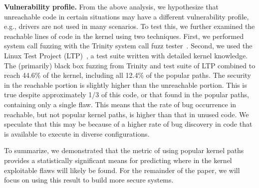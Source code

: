 \textbf{Vulnerability profile.}
From the above analysis, we hypothesize that unreachable code in certain
situations may have a different vulnerability profile, e.g., drivers are not used
in many scenarios.  To test this, we
further examined the reachable lines of
code in the kernel using two techniques. First,
we performed system call fuzzing with the Trinity
system call fuzz tester~\cite{Trinity}.
Second, we used the Linux Test Project (LTP)~\cite{LTP}, a test suite written
with detailed kernel knowledge.
%
The (primarily) black box fuzzing from Trinity and test suite of
LTP combined to reach 44.6\% of the kernel, including all 12.4\% of the popular
paths.  The security in the reachable portion is
slightly higher than the unreachable portion. This is true despite
approximately 1/3 of this code, or that found in the popular paths, containing
 only a single flaw. This means that the rate of bug occurrence in reachable, but
not popular kernel paths, is higher than that in unused
code. We speculate that this may be because of a higher rate of bug discovery
in code that is available to execute in diverse configurations.

To summarize, we demonstrated that the metric of using popular
kernel paths provides a statistically significant
means for predicting where in the kernel exploitable flaws
will likely be found. For the remainder of the paper, we will
focus on using this result to build more secure systems.
